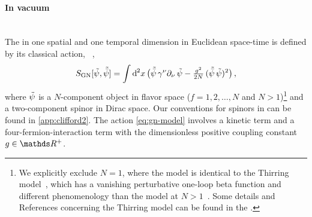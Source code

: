 \paragraph{In vacuum}\label{paragraph:gnyVac}\mbox{}\\%
The \gnm{} in one spatial and one temporal dimension in Euclidean space-time is defined by its classical action, \cf{}\ ,
\begin{align}
	S_\mathrm{GN} [ \Fpsi,\Fpsib ] = \int \dif^{\,2}\! x \, \big( \Fpsib \, \gamma^\nu\partial_\nu \, \Fpsi - \tfrac{g^2}{2 N} \, ( \Fpsib \, \Fpsi )^2 \big) \, ,	\label{eq:gn-model}
\end{align}
where $\tilde{\psi}$ is a $N$-component object in flavor space ($f = 1, 2, \dots, N$ and $N > 1$)\footnote{We explicitly exclude $N = 1$, where the \gn{} model is identical to the Thirring model~\cite{Thirring:1958in,Witten:1978qu}, which has a vanishing perturbative one-loop beta function and different phenomenology than the \gn{} model at $N>1$~\cite{Peskin:1995ev,ZinnJustin:2002ru}. Some details and References concerning the Thirring model can be found in the .} and a two-component spinor in Dirac space.
Our conventions for spinors in \dtwo{} can be found in \cref{app:clifford2}.
The action \eqref{eq:gn-model} involves a kinetic term and a four-fermion-interaction term with the dimensionless positive coupling constant $g\in \Reals{}^+$.
	
